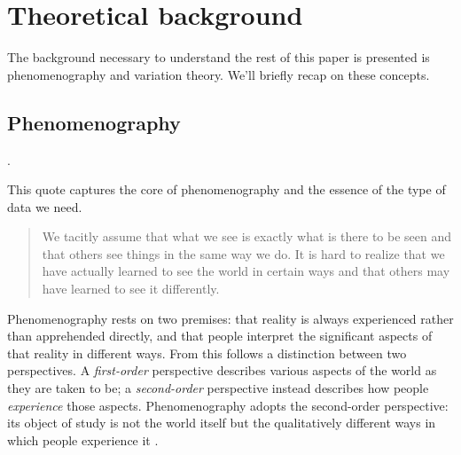 \mode*
\section{Theoretical background}

The background necessary to understand the rest of this paper is presented is 
phenomenography and variation theory.
We'll briefly recap on these concepts.

\subsection{Phenomenography}

\begin{frame}
  .
\end{frame}
This quote captures the core of phenomenography and the essence of the type of 
data we need.

\blockcquote{NCOL}{%
  We tacitly assume that what we see is exactly what is there to be seen and 
  that others see things in the same way we do. It is hard to realize that we 
  have actually learned to see the world in certain ways and that others may 
  have learned to see it differently.
}

Phenomenography rests on two premises: that reality is always experienced
rather than apprehended directly, and that people interpret the significant
aspects of that reality in different ways. From this follows a distinction
between two perspectives. A \emph{first-order} perspective describes various
aspects of the world as they are taken to be; a \emph{second-order} perspective
instead describes how people \emph{experience} those aspects. Phenomenography
adopts the second-order perspective: its object of study is not the world itself
but the qualitatively different ways in which people experience it
\autocite{Phenomenography}.

